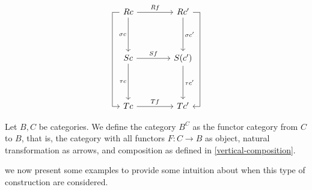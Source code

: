 $$
\begin{tikzcd}[row sep = 1.4cm, column sep = 1.4cm]
  R c
  \arrow[lddr, to path= { --
    ([xshift=-1ex]\tikztostart.west)
    -| ([xshift=-2ex]\tikztotarget.west)
    |- (\tikztotarget)}]
  \arrow[d, swap, "\sigma c"]
  \arrow[r, "R f"] 
  & R c'
  \arrow[d, "\sigma c'"]
  \arrow[rddl, to path= { --
    ([xshift=1ex]\tikztostart.east) 
    -| ([xshift=2ex]\tikztotarget.east)
    -- (\tikztotarget)}, "\sigma \circ \tau c'"]
  \\
  S c
  \arrow[d, swap, "\tau c "] 
  \arrow[r, "S f "] & S(c')
  \arrow[d, "\tau c'"] \\
  T c 
  \arrow[r, "T f"] & T c'
\end{tikzcd}
$$



\begin{definition}
  Let $B,C$ be categories. We define the category $B^C$ as the functor category from $C$ to $B$, that is, the category with all functors $F:C \to B$ as object, natural transformation as arrows, and composition as defined in \ref{vertical-composition}.
\end{definition}

we now present some examples to provide some intuition about when this type of construction are considered.

